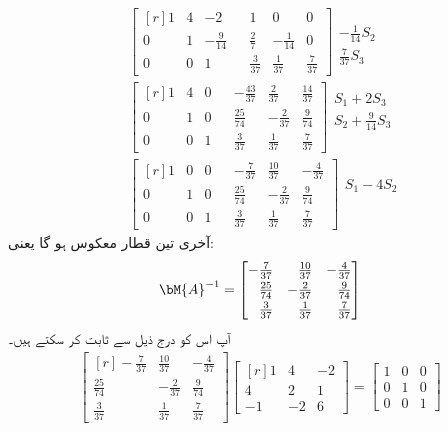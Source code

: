  \begin{align*}
&\begin{bmatrix*}[r] 1&4&-2&& 1&0&0\\[0.5ex]0&1&-\frac{9}{14}&&\frac{2}{7}&-\frac{1}{14}&0\\[0.5ex]0&0&1&&\frac{3}{37}&\frac{1}{37}&\frac{7}{37}\end{bmatrix*}
\begin{matrix} \\[0.5ex]-\frac{1}{14}S_2 \\[0.5ex] \frac{7}{37}S_3 \end{matrix}\\
&\begin{bmatrix*}[r] 1&4&0&&-\frac{43}{37}&\frac{2}{37}&\frac{14}{37}\\[0.5ex]0&1&0&&\frac{25}{74}&-\frac{2}{37}&\frac{9}{74}\\[0.5ex]0&0&1&&\frac{3}{37}&\frac{1}{37}&\frac{7}{37}\end{bmatrix*}
\begin{matrix}S_1+2S_3 \\[0.5ex] S_2+\frac{9}{14}S_3  \\[0.5ex] \\  \end{matrix}\\
&\begin{bmatrix*}[r] 1&0&0&&-\frac{7}{37}&\frac{10}{37}&-\frac{4}{37}\\[0.5ex]0&1&0&&\frac{25}{74}&-\frac{2}{37}&\frac{9}{74}\\[0.5ex]0&0&1&&\frac{3}{37}&\frac{1}{37}&\frac{7}{37}\end{bmatrix*}
\begin{matrix}S_1-4S_2 \\ \\ \\  \end{matrix}
\end{align*}
آخری تین قطار معکوس  ہو گا یعنی:
\begin{align*}
\bM{A}^{-1}=\begin{bmatrix*}[r] -\frac{7}{37}&\frac{10}{37}&-\frac{4}{37}\\[0.5ex]\frac{25}{74}&-\frac{2}{37}&\frac{9}{74}\\[0.5ex]\frac{3}{37}&\frac{1}{37}&\frac{7}{37}\end{bmatrix*}
\end{align*}
آپ اس کو درج ذیل سے ثابت کر سکتے ہیں۔
\begin{align*}
\begin{bmatrix*}[r] -\frac{7}{37}&\frac{10}{37}&-\frac{4}{37}\\[0.5ex]\frac{25}{74}&-\frac{2}{37}&\frac{9}{74}\\[0.5ex]\frac{3}{37}&\frac{1}{37}&\frac{7}{37}\end{bmatrix*}\begin{bmatrix*}[r] 1&4&-2\\4&2&1\\-1&-2&6 \end{bmatrix*}=\begin{bmatrix}1&0&0\\0&1&0\\0&0&1\end{bmatrix}
\end{align*}
